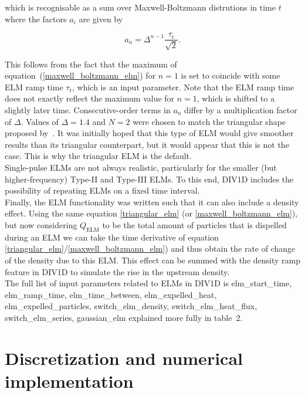 \documentclass[amsmath,amssymb,a4]{revtex4-2}
\begin{document}
which is recognisable as a sum over Maxwell-Boltzmann distrutions in time $t$ where the factors $a_i$ are given by

\begin{equation}
\label{maxwell_boltzmann_elm_a}
a_n = \Delta^{n-1}\frac{\tau_{\mathrm{r}}}{\sqrt{2}}.
\end{equation}

This follows from the fact that the maximum of equation~(\ref{maxwell_boltzmann_elm}) for $n=1$ is set to coincide with some ELM ramp time $\tau_{\mathrm{r}}$, which is an input parameter. Note that the ELM ramp time does not exactly reflect the maximum value for $n=1$, which is shifted to a slightly later time. Consecutive-order terms in $a_n$ differ by a multiplication factor of $\Delta$. Values of $\Delta=1.4$ and $N=2$ were chosen to match the triangular shape proposed by~\cite{eich2017}. It was initially hoped that this type of ELM would give smoother results than its triangular counterpart, but it would appear that this is not the case. This is why the triangular ELM is the default.\\

Single-pulse ELMs are not always realistic, particularly for the smaller (but higher-frequency) Type-II and Type-III ELMs. To this end, DIV1D includes the possibility of repeating ELMs on a fixed time interval.\\

Finally, the ELM functionality was written such that it can also include a density effect. Using the same equation \ref{triangular_elm} (or \ref{maxwell_boltzmann_elm}), but now considering $Q_{\mathrm{ELM}}$ to be the total amount of particles that is dispelled during an ELM we can take the time derivative of equation \ref{triangular_elm}/\ref{maxwell_boltzmann_elm}) and thus obtain the rate of change of the density due to this ELM. This effect can be summed with the density ramp feature in DIV1D to simulate the rise in the upstream density.\\

The full list of input parameters related to ELMs in DIV1D is
elm\_start\_time,
elm\_ramp\_time,
elm\_time\_between,
elm\_expelled\_heat,
elm\_expelled\_particles,
switch\_elm\_density,
switch\_elm\_heat\_flux,
switch\_elm\_series,
gaussian\_elm
explained more fully in table~2.

\section{Discretization and numerical implementation}\label{numerics}
\end{document}
